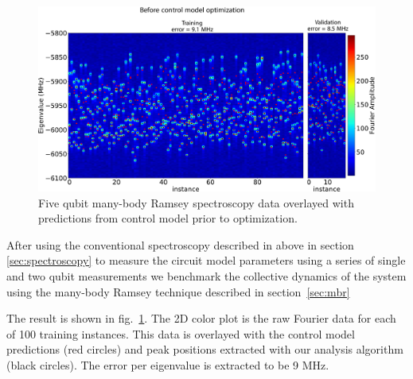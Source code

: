 \begin{figure}[h]
    \begin{center}
        \includegraphics[width=150 mm]{./PDF/fourier_amp_2d_tv_pre.pdf}
    \end{center}
        \caption{
        Five qubit many-body Ramsey spectroscopy data overlayed with predictions from control model prior to optimization.
        }
    \label{mbr_benchmark_pre_optimization}
\end{figure}
After using the conventional spectroscopy described in above in section \ref{sec:spectroscopy} to measure the circuit model parameters
using a series of single and two qubit measurements we benchmark the collective dynamics of the system using the many-body Ramsey technique
described in section~\ref{sec:mbr}

The result is shown in fig.~\ref{mbr_benchmark_pre_optimization}.
The 2D color plot is the raw Fourier data for each of 100 training instances.
This data is overlayed with the control model predictions (red circles) and peak positions extracted with our analysis algorithm (black circles).
The error per eigenvalue is extracted to be 9 MHz.

